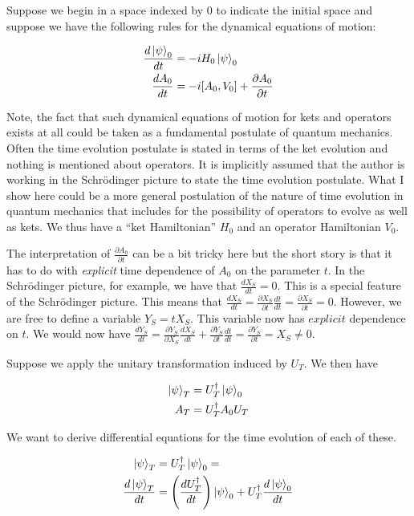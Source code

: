 \documentclass[12pt]{article}
\newcommand{\ddt}[1]{\frac{d #1}{dt}}
\begin{document}
Suppose we begin in a space indexed by $0$ to indicate the initial space and suppose we have the following rules for the dynamical equations of motion:

\begin{align}
\ddt{\ket{\psi}_0} &= -i H_0 \ket{\psi}_0\\
\ddt{A_0} &= -i[A_0,V_0] + \frac{\partial A_0}{\partial t}
\end{align}

Note, the fact that such dynamical equations of motion for kets and operators exists at all could be taken as a fundamental postulate of quantum mechanics. Often the time evolution postulate is stated in terms of the ket evolution and nothing is mentioned about operators. It is implicitly assumed that the author is working in the Schr{\"o}dinger picture to state the time evolution postulate. What I show here could be a more general postulation of the nature of time evolution in quantum mechanics that includes for the possibility of operators to evolve as well as kets. We thus have a ``ket Hamiltonian'' $H_0$ and an operator Hamiltonian $V_0$.

The interpretation of $\frac{\partial A_0}{\partial t}$ can be a bit tricky here but the short story is that it has to do with \textit{explicit} time dependence of $A_0$ on the parameter $t$. In the Schr{\"o}dinger picture, for example, we have that $\ddt{X_S} = 0$. This is a special feature of the Schr{\"o}dinger picture. This means that $\ddt{X_S} = \frac{\partial X_S}{\partial t} \ddt{t} = \frac{\partial X_S}{\partial t} =  0$. However, we are free to define a variable $Y_S = t X_S$. This variable now has $\textit{explicit}$ dependence on $t$. We would now have $\ddt{Y_S} = \frac{\partial{Y_S}}{\partial X_S} \ddt{X_S} + \frac{\partial{Y_S}}{\partial t} \ddt{t} = \frac{\partial Y_S}{\partial t}= X_S \neq 0$.

Suppose we apply the unitary transformation induced by $U_T$. We then have

\begin{align}
\ket{\psi}_T &= U_T^{\dag} \ket{\psi}_0\\
A_T &= U_T^{\dag} A_0 U_T
\end{align}

We want to derive differential equations for the time evolution of each of these.

\begin{align}
\ket{\psi}_T &= U_T^{\dag}\ket{\psi}_0 =\\
\ddt{\ket{\psi}_T} &= \left(\ddt{U_T^{\dag}} \right) \ket{\psi}_0 + U_T^{\dag} \ddt{\ket{\psi}_0}
\end{align}
\end{document}
